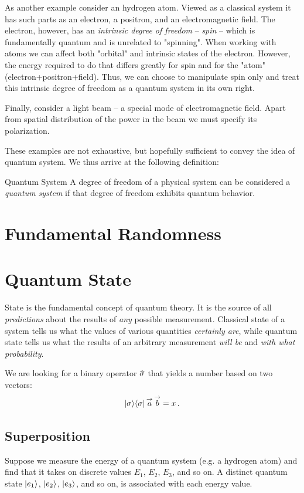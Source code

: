 As another example consider an hydrogen atom. Viewed as a classical system it has such parts as an electron, a positron, and an electromagnetic field. The electron, however, has an \emph{intrinsic degree of freedom} -- \emph{spin} -- which is fundamentally quantum and is unrelated to "spinning". When working with atoms we can affect both "orbital" and intrinsic states of the electron. However, the energy required to do that differs greatly for spin and for the "atom" (electron+positron+field). Thus, we can choose to manipulate spin only and treat this intrinsic degree of freedom as a quantum system in its own right.

Finally, consider a light beam -- a special mode of electromagnetic field. Apart from spatial distribution of the power in the beam we must specify its polarization.


These examples are not exhaustive, but hopefully sufficient to convey the idea of quantum system. We thus arrive at the following definition:
\begin{mydef}{Quantum System}
	A degree of freedom of a physical system can be considered a \emph{quantum system} if that degree of freedom exhibits quantum behavior.
\end{mydef}

\section{Fundamental Randomness}



\section{Quantum State}\label{sec:QuantumState}
State is the fundamental concept of quantum theory. It is the source of all \emph{predictions} about the results of \emph{any} possible measurement. Classical state of a system tells us what the values of various quantities \emph{certainly are}, while quantum state tells us what the results of an arbitrary measurement \emph{will be} and \emph{with what probability}.

We are looking for a binary operator $\op{\sigma}$ that yields a number
based on two vectors:
\[
|{\sigma}\rangle\langle{\sigma}|\,\overset{\rightarrow}{a}\,\overset{\rightarrow}{b}=x\,.
\]



\subsection{Superposition}
Suppose we measure the energy of a quantum system (e.g. a hydrogen atom) and find that it takes on discrete values $E_1$, $E_2$, $E_3$, and so on. A distinct quantum state $|{e_1}\rangle$, $|{e_2}\rangle$, $|{e_3}\rangle$, and so on, is associated with each energy value.

